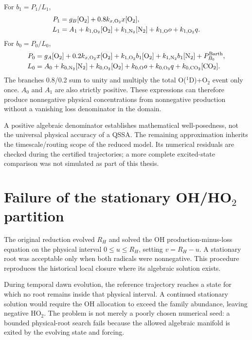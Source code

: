 For $b_1=P_1/L_1$,
\begin{align}
P_1&=g_B[\mathrm{O}_2]+0.8k_{x,\mathrm{O_2}}x[\mathrm{O}_2],\nonumber\\
L_1&=A_1+k_{1,\mathrm{O_2}}[\mathrm{O}_2]+k_{1,\mathrm{N_2}}[\mathrm{N_2}]+k_{1,\mathrm{O}}o+k_{1,\mathrm{O_3}}q.
\label{eq:qssab1}
\end{align}
For $b_0=P_0/L_0$,
\begin{align}
P_0={}&g_A[\mathrm{O}_2]+0.2k_{x,\mathrm{O_2}}x[\mathrm{O}_2]
+k_{1,\mathrm{O_2}}b_1[\mathrm{O}_2]+k_{1,\mathrm{N_2}}b_1[\mathrm{N_2}]+P_{B_0}^{\mathrm{Barth}},\nonumber\\
L_0={}&A_0+k_{0,\mathrm{N_2}}[\mathrm{N_2}]+k_{0,\mathrm{O_2}}[\mathrm{O}_2]
+k_{0,\mathrm{O}}o+k_{0,\mathrm{O_3}}q+k_{0,\mathrm{CO_2}}[\mathrm{CO_2}].
\label{eq:qssab0}
\end{align}
The branches 0.8/0.2 sum to unity and multiply the total O($^1$D)+O$_2$ event only once. $A_0$ and $A_1$ are also strictly positive. These expressions can therefore produce nonnegative physical concentrations from nonnegative production without a vanishing loss denominator in the domain.

A positive algebraic denominator establishes mathematical well-posedness, not the universal physical accuracy of a QSSA. The remaining approximation inherits the timescale/routing scope of the reduced model. Its numerical residuals are checked during the certified trajectories; a more complete excited-state comparison was not simulated as part of this thesis.

\section{Failure of the stationary \texorpdfstring{OH/HO$_2$}{OH/HO2} partition}
The original reduction evolved $R_H$ and solved the OH production-minus-loss equation on the physical interval $0\leq u\leq R_H$, setting $v=R_H-u$. A stationary root was acceptable only when both radicals were nonnegative. This procedure reproduces the historical local closure where its algebraic solution exists.

During temporal dawn evolution, the reference trajectory reaches a state for which no root remains inside that physical interval. A continued stationary solution would require the OH allocation to exceed the family abundance, leaving negative HO$_2$. The problem is not merely a poorly chosen numerical seed: a bounded physical-root search fails because the allowed algebraic manifold is exited by the evolving state and forcing.

